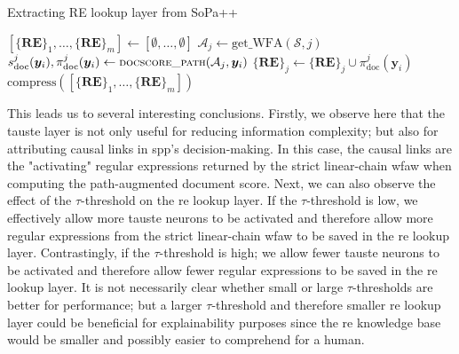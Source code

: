 \begin{algorithm}[t!]
  \small
  \caption{Extracting RE lookup layer from SoPa++}
  \label{algo:simplification_process}
  \begin{algorithmic}[1]
    \Statex
    \State $[\{\textbf{RE}\}_1, \ldots, \{\textbf{RE}\}_m] \gets [\emptyset,
    \ldots, \emptyset]$
    \State $\mathcal{A}_j \gets \text{get\_WFA}(\mathcal{S}, j)$
    \State $s^j_{\text{doc}}(\bm{y}_i), \pi^j_{\text{doc}}(\bm{y}_i) \gets
    {\small\textsc{docscore\_path}}(\mathcal{A}_j, \bm{y}_i)$
    \State $\{\textbf{RE}\}_j \gets \{\textbf{RE}\}_j \cup
    \pi^j_{\text{doc}}(\bm{y}_i)$
    \EndIf
    \EndFor
    \EndFor
    \State \Return $\text{compress}([\{\textbf{RE}\}_1, \ldots, \{\textbf{RE}\}_m])$
    \EndFunction
  \end{algorithmic}
\end{algorithm}

This leads us to several interesting conclusions. Firstly, we observe here that
the \ac{tauste} layer is not only useful for reducing information complexity; but
also for attributing causal links in \ac{spp}'s decision-making. In this case,
the causal links are the "activating" regular expressions returned by the
strict linear-chain \ac{wfaw} when computing the path-augmented document
score. Next, we can also observe the effect of the $\tau$-threshold on the \ac{re}
lookup layer. If the $\tau$-threshold is low, we effectively allow more \ac{tauste}
neurons to be activated and therefore allow more regular expressions from the
strict linear-chain \ac{wfaw} to be saved in the \ac{re} lookup layer.
Contrastingly, if the $\tau$-threshold is high; we allow fewer \ac{tauste} neurons to
be activated and therefore allow fewer regular expressions to be saved in the \ac{re}
lookup layer. It is not necessarily clear whether small or large
$\tau$-thresholds are better for performance; but a larger $\tau$-threshold and
therefore smaller \ac{re} lookup layer could be beneficial for explainability
purposes since the \ac{re} knowledge base would be smaller and possibly easier
to comprehend for a human. 

